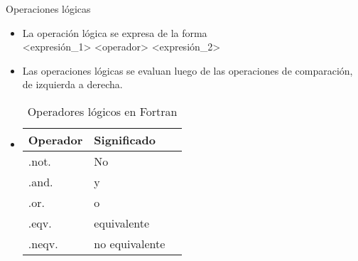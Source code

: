 \begin{frame}[fragile]{Operaciones lógicas}  
 \begin{itemize}[<+(0)->]
  \item La operación lógica se expresa de la forma \\
      \centering <expresión\_1> <operador> <expresión\_2>
  \item Las operaciones lógicas se evaluan luego de las operaciones de comparación, de izquierda a derecha.
     \vspace{0.4cm}
  \item []
    \begin{table}[]
    \centering
    \label{Tabla_logica}
    \begin{tabular}{|l|l|l|}
    \hline
    Operador    & Significado     \\ \hline
    .not.       & No              \\ \hline
    .and.       & y               \\ \hline
    .or.        & o               \\ \hline
    .eqv.       & equivalente     \\ \hline
    .neqv.      & no equivalente  \\ \hline              
    \end{tabular}
    \caption*{Operadores lógicos en Fortran}
    \end{table}
 \end{itemize}
\end{frame}
